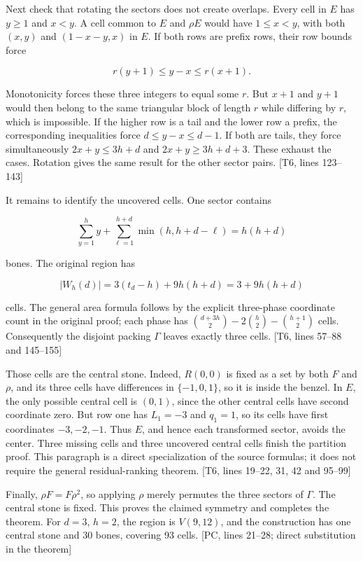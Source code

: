 \documentclass[
  11pt,
]{article}
\begin{document}
Next check that rotating the sectors does not create overlaps. Every
cell in \(E\) has \(y\ge1\) and \(x<y\). A cell common to \(E\) and
\(\rho E\) would have \(1\le x<y\), with both \((x,y)\) and
\((1-x-y,x)\) in \(E\). If both rows are prefix rows, their row bounds
force

\[
r(y+1)\le y-x\le r(x+1).
\]

Monotonicity forces these three integers to equal some \(r\). But
\(x+1\) and \(y+1\) would then belong to the same triangular block of
length \(r\) while differing by \(r\), which is impossible. If the
higher row is a tail and the lower row a prefix, the corresponding
inequalities force \(d\le y-x\le d-1\). If both are tails, they force
simultaneously \(2x+y\le3h+d\) and \(2x+y\ge3h+d+3\). These exhaust the
cases. Rotation gives the same result for the other sector pairs. {[}T6,
lines 123--143{]}

It remains to identify the uncovered cells. One sector contains

\[
\sum_{y=1}^{h}y+
\sum_{\ell=1}^{h+d}\min(h,h+d-\ell)=h(h+d)
\]

bones. The original region has

\[
|W_h(d)|=3(t_d-h)+9h(h+d)=3+9h(h+d)
\]

cells. The general area formula follows by the explicit three-phase
coordinate count in the original proof; each phase has
\(\binom{d+3h}{2}-2\binom h2-\binom{h+1}{2}\) cells. Consequently the
disjoint packing \(\Gamma\) leaves exactly three cells. {[}T6, lines
57--88 and 145--155{]}

Those cells are the central stone. Indeed, \(R(0,0)\) is fixed as a set
by both \(F\) and \(\rho\), and its three cells have differences in
\(\{-1,0,1\}\), so it is inside the benzel. In \(E\), the only possible
central cell is \((0,1)\), since the other central cells have second
coordinate zero. But row one has \(L_1=-3\) and \(q_1=1\), so its cells
have first coordinates \(-3,-2,-1\). Thus \(E\), and hence each
transformed sector, avoids the center. Three missing cells and three
uncovered central cells finish the partition proof. This paragraph is a
direct specialization of the source formulas; it does not require the
general residual-ranking theorem. {[}T6, lines 19--22, 31, 42 and
95--99{]}

Finally, \(\rho F=F\rho^2\), so applying \(\rho\) merely permutes the
three sectors of \(\Gamma\). The central stone is fixed. This proves the
claimed symmetry and completes the theorem. For \(d=3\), \(h=2\), the
region is \(V(9,12)\), and the construction has one central stone and 30
bones, covering 93 cells. {[}PC, lines 21--28; direct substitution in
the theorem{]}
\end{document}
